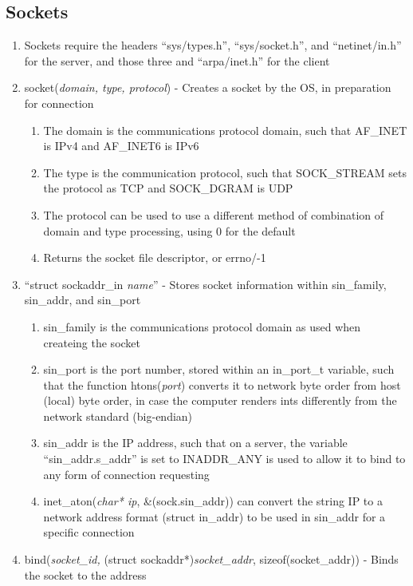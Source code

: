 \documentclass[11 pt, twoside]{article}
\begin{document}
\begin{enumerate}
\subsection{Sockets}
\begin{enumerate}
\item Sockets require the headers ``sys/types.h'', ``sys/socket.h'', and ``netinet/in.h'' for the server, and those three and ``arpa/inet.h'' for the client
\item socket(\textit{domain, type, protocol}) - Creates a socket by the OS, in preparation for connection
\begin{enumerate}
\item The domain is the communications protocol domain, such that AF\_INET is IPv4 and AF\_INET6 is IPv6
\item The type is the communication protocol, such that SOCK\_STREAM sets the protocol as TCP and SOCK\_DGRAM is UDP
\item The protocol can be used to use a different method of combination of domain and type processing, using 0 for the default
\item Returns the socket file descriptor, or errno/-1
\end{enumerate}
\item ``struct sockaddr\_in \textit{name}'' - Stores socket information within sin\_family, sin\_addr, and sin\_port
\begin{enumerate}
\item sin\_family is the communications protocol domain as used when createing the socket
\item sin\_port is the port number, stored within an in\_port\_t variable, such that the function htons(\textit{port}) converts it to network byte order from host (local) byte order, in case the computer renders ints differently from the network standard (big-endian)
\item sin\_addr is the IP address, such that on a server, the variable ``sin\_addr.s\_addr'' is set to INADDR\_ANY is used to allow it to bind to any form of connection requesting\item inet\_aton(\textit{char* ip}, &(sock.sin\_addr)) can convert the string IP to a network address format (struct in\_addr) to be used in sin\_addr for a specific connection
\end{enumerate}
\item bind(\textit{socket\_id,} (struct sockaddr*)\textit{socket\_addr}, {sizeof(socket\_addr)}) - Binds the socket to the address
\begin{enumerate}

\end{enumerate}
\end{enumerate}
\end{enumerate}
\end{document}
